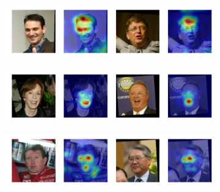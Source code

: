 \documentclass[runningheads]{llncs}
\begin{document}
\begin{figure}
\captionsetup[subfigure]{labelformat=empty}
    \centering
    \begin{subfigure}
        \centering
        \includegraphics[width=0.65\linewidth, trim={0 1cm 0 0},clip]{bald-1.jpeg}
        \footnotesize
        \vspace{0.4cm}
    \end{subfigure}
    
    \begin{subfigure}
        \centering
        \includegraphics[width=0.65\linewidth, trim={0 1cm 0 0},clip]{smile-1.jpeg}
        \footnotesize
        \vspace{0.4cm}
    \end{subfigure}
    
    \begin{subfigure}
        \centering
        \includegraphics[width=0.65\linewidth, trim={0 1cm 0 0},clip]{eyesopen-1.jpeg}
        \footnotesize
        \vspace{0.4cm}
    \end{subfigure}
    

\end{figure}
\end{document}
